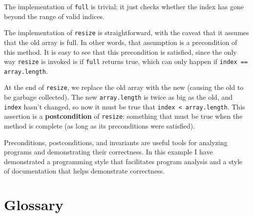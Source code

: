 \documentclass[12pt]{book}
\theoremstyle{exercise}
\begin{document}

The implementation of {\tt full} is trivial; it just checks
whether the index has gone beyond the range of valid indices.

The implementation of {\tt resize} is straightforward, with
the caveat that it assumes that the old array is full.  In other
words, that assumption is a precondition of this method.  It is
easy to see that this precondition is satisfied, since the only
way {\tt resize} is invoked is if {\tt full} returns true,
which can only happen if {\tt index == array.length}.

At the end of {\tt resize}, we replace the old array with
the new (causing the old to be garbage collected).  The
new {\tt array.length} is twice as big as the old, and 
{\tt index} hasn't changed, so now it must be true that
{\tt index < array.length}.  This assertion is a {\bf postcondition}
of {\tt resize}: something that must be true when the method
is complete (as long as its preconditions were satisfied).

Preconditions, postconditions, and invariants are useful tools
for analyzing programs and demonstrating their correctness.
In this example I have demonstrated a programming style that
facilitates program analysis and a style of documentation that
helps demonstrate correctness.


\section{Glossary}
\end{document}
